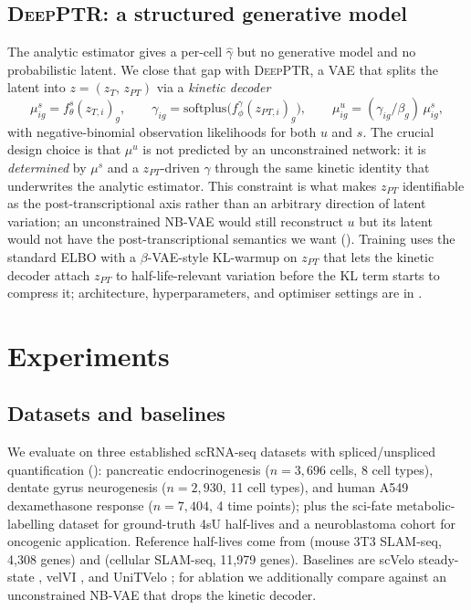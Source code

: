\documentclass{article}
\begin{document}
\subsection{\textsc{DeepPTR}: a structured generative model}
\label{sec:deepptr}

The analytic estimator gives a per-cell $\widehat\gamma$ but no generative
model and no probabilistic latent. We close that gap with
\textsc{DeepPTR}, a VAE that splits the latent into
$z {=} (z_T,\, z_{PT})$ via a \emph{kinetic decoder}
\begin{equation}
  \mu^s_{ig} = f^s_\theta(z_{T,i})_g,\qquad
  \gamma_{ig} = \mathrm{softplus}\bigl(f^\gamma_\phi(z_{PT,i})_g\bigr),\qquad
  \mu^u_{ig} = (\gamma_{ig}/\beta_g)\, \mu^s_{ig},
\end{equation}
with negative-binomial observation likelihoods for both $u$ and $s$. The
crucial design choice is that $\mu^u$ is not predicted by an unconstrained
network: it is \emph{determined} by $\mu^s$ and a $z_{PT}$-driven $\gamma$
through the same kinetic identity that underwrites the analytic
estimator. This constraint is what makes $z_{PT}$ identifiable as the
post-transcriptional axis rather than an arbitrary direction of latent
variation; an unconstrained NB-VAE would still reconstruct $u$ but its
latent would not have the post-transcriptional semantics we want
(). Training uses the standard ELBO with a
$\beta$-VAE-style KL-warmup on $z_{PT}$ that lets the kinetic decoder
attach $z_{PT}$ to half-life-relevant variation before the KL term
starts to compress it; architecture, hyperparameters, and optimiser
settings are in .

\section{Experiments}
\label{sec:results}

\subsection{Datasets and baselines}

We evaluate on three established scRNA-seq datasets with spliced/unspliced
quantification (): pancreatic endocrinogenesis
($n{=}3{,}696$ cells, 8 cell types), dentate gyrus neurogenesis
($n{=}2{,}930$, 11 cell types), and human A549 dexamethasone response
($n{=}7{,}404$, 4 time points); plus the sci-fate metabolic-labelling
dataset \citep{cao2020} for ground-truth 4sU half-lives and a neuroblastoma
cohort \citep{dong2020} for oncogenic application. Reference half-lives
come from \citet{schofield2018} (mouse 3T3 SLAM-seq, 4{,}308 genes) and
\citet{herzog2017} (cellular SLAM-seq, 11{,}979 genes). Baselines are
scVelo steady-state \citep{bergen2020}, velVI \citep{velvi}, and
UniTVelo \citep{unitvelo}; for ablation we additionally compare against an
unconstrained NB-VAE that drops the kinetic decoder.
\end{document}
